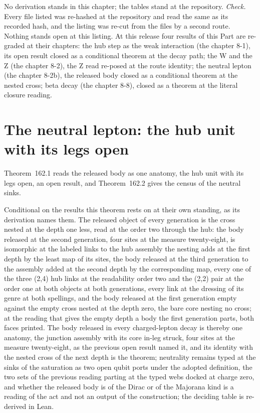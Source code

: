 \begin{chproof}[instrument]
No derivation stands in this chapter; the tables stand at the repository.
\emph{Check.} Every file listed was re-hashed at the repository and read the same as its recorded hash, and the listing was re-cut from the files by a second route.
Nothing stands open at this listing. At this release four results of this Part are re-graded at their chapters: the hub step as the weak interaction (the chapter 8-1), its open result closed as a conditional theorem at the decay path; the W and the Z (the chapter 8-2), the Z read re-posed at the route identity; the neutral lepton (the chapter 8-2b), the released body closed as a conditional theorem at the nested cross; beta decay (the chapter 8-8), closed as a theorem at the literal closure reading.
\end{chproof}
\label{chend:VIII-L-the-instrument-tables-at-the-repository}
\section{The neutral lepton: the hub unit with its legs open}\label{mod:VI-2b-neutral-lepton-the-hub-unit-with-its-legs-open}
\label{narr:open:6-2b}Theorem~162.1 reads the released body as one anatomy, the hub unit with its legs open, an open result, and Theorem~162.2 gives the census of the neutral sinks.
\begin{chconditional}\label{box:VI-2b-neutral-lepton-the-hub-unit-with-its-legs-open:1}
Conditional on the results this theorem rests on at their own standing, as its derivation names them.
The released object of every generation is the cross nested at the depth one less, read at the order two through the hub: the body released at the second generation, four sites at the measure twenty-eight, is isomorphic at the labeled links to the hub assembly the nesting adds at the first depth by the least map of its sites, the body released at the third generation to the assembly added at the second depth by the corresponding map, every one of the three (2,4) hub links at the readability order two and the (2,2) pair at the order one at both objects at both generations, every link at the dressing of its genre at both spellings, and the body released at the first generation empty against the empty cross nested at the depth zero, the bare core nesting no cross; at the reading that gives the empty depth a body the first generation parts, both faces printed. The body released in every charged-lepton decay is thereby one anatomy, the junction assembly with its core in-leg struck, four sites at the measure twenty-eight, as the previous open result named it, and its identity with the nested cross of the next depth is the theorem; neutrality remains typed at the sinks of the saturation as two open qubit ports under the adopted definition, the two sets of the previous reading parting at the typed webs docked at charge zero, and whether the released body is of the Dirac or of the Majorana kind is a reading of the act and not an output of the construction; the deciding table is re-derived in Lean.
\end{chconditional}
